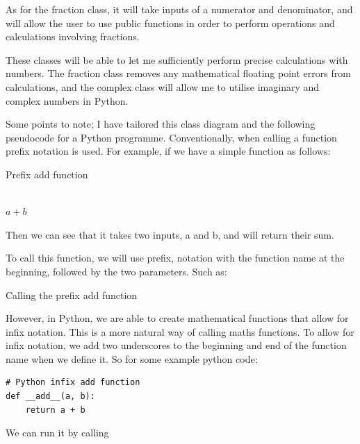 \documentclass[12pt]{article}
\begin{document}
As for the fraction class, it will take inputs of a numerator and denominator, and will allow the user to use public functions in order to perform operations and calculations involving fractions.

These classes will be able to let me sufficiently perform precise calculations with numbers. The fraction class removes any mathematical floating point errors from calculations, and the complex class will allow me to utilise imaginary and complex numbers in Python.

Some points to note; I have tailored this class diagram and the following pseudocode for a Python programme. Conventionally, when calling a function prefix notation is used. For example, if we have a simple function as follows:

\begin{algorithm}
    \caption{Prefix add function}
    \begin{algorithmic}
        \\
             \hspace{\algorithmicindent}\Return $a + b$
        \EndFunction
    \end{algorithmic}
\end{algorithm}

Then we can see that it takes two inputs, a and b, and will return their sum.

To call this function, we will use prefix, notation with the function name at the beginning, followed by the two parameters.
Such as:

\begin{algorithm}
    \caption{Calling the prefix add function}
    \begin{algorithmic}
       \State {}
    \end{algorithmic}
\end{algorithm}

However, in Python, we are able to create mathematical functions that allow for infix notation. This is a more natural way of calling maths functions. To allow for infix notation, we add two underscores to the beginning and end of the function name when we define it. So for some example python code:


\begin{lstlisting}
# Python infix add function
def __add__(a, b):
    return a + b
\end{lstlisting}

We can run it by calling
\end{document}

